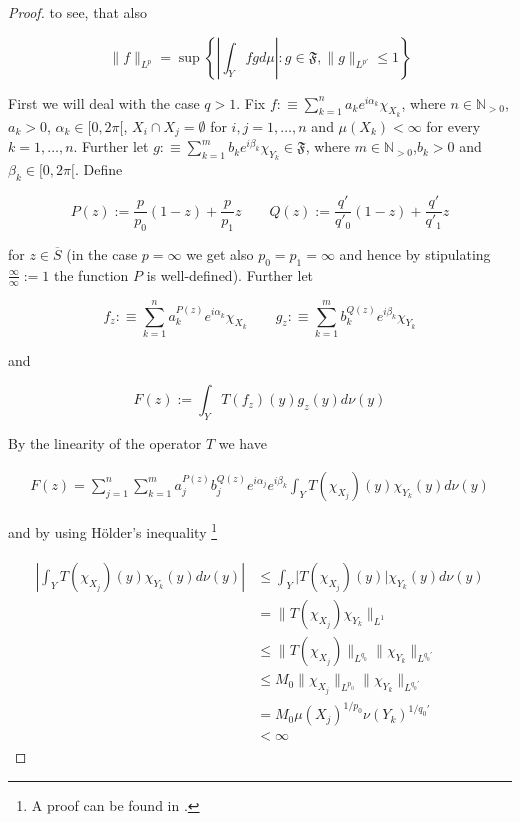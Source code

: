 \begin{proof}
	to see, that also

	\begin{equation*}
		\|f\|_{L^p} = \sup \left\{ \left\vert \int_Y fgd\mu\right\vert : g \in \mathfrak{F},\|g\|_{L^{p'}} \leqslant 1\right\}
	\end{equation*}

	First we will deal with the case \underline{$q > 1$}. Fix $f :\equiv \sum_{k = 1}^n a_k e^{i\alpha_k}\chi_{X_k}$, where $n \in \mathbb{N}_{>0}$,$a_k > 0$, $\alpha_k \in [0,2\pi[$, $X_i \cap X_j = \emptyset$ for $i,j = 1,\hdots,n$ and $\mu(X_k) < \infty$ for every $k = 1,\hdots,n$. Further let $g :\equiv \sum_{k = 1}^m b_k e^{i\beta_k}\chi_{Y_k} \in \mathfrak{F}$, where $m \in \mathbb{N}_{>0}$,$b_k > 0$ and $\beta_k \in [0,2\pi[$. Define

				\begin{equation*}
					P(z) := \frac{p}{p_0}(1 - z) + \frac{p}{p_1}z \qquad Q(z) := \frac{q'}{q'_0}(1 - z) + \frac{q'}{q'_1}z
				\end{equation*}

				for $z \in \overline{S}$ (in the case $p = \infty$ we get also $p_0 = p_1 = \infty$ and hence by stipulating $\frac{\infty}{\infty}:= 1$ the function $P$ is well-defined). Further let
				
				\begin{equation}
					f_z :\equiv \sum_{k = 1}^n a^{P(z)}_k e^{i\alpha_k}\chi_{X_k} \qquad g_z :\equiv  \sum_{k = 1}^m b^{Q(z)}_k e^{i\beta_k}\chi_{Y_k}
					\label{def:fzgz}
				\end{equation}
				
				and 

				\begin{equation}
					F(z) := \int_Y T(f_z)(y)g_z(y)d\nu(y)
				\end{equation}

				By the linearity of the operator $T$ we have

				\begin{gather}
					F(z) = \sum_{j = 1}^n\sum_{k = 1}^m a^{P(z)}_j b_j^{Q(z)} e^{i\alpha_j} e^{i\beta_k} \int_YT(\chi_{X_j})(y)\chi_{Y_k}(y)d\nu(y) 
				\end{gather}

				and by using H\"older's inequality \footnote{A proof can be found in \cite[223]{elstrodt:mass:2011}.}

				\begin{gather}
					\begin{aligned}
						\left\vert \int_YT(\chi_{X_j})(y)\chi_{Y_k}(y)d\nu(y) \right\vert &\leqslant \int_Y\vert T(\chi_{X_j})(y)\vert \chi_{Y_k}(y)d\nu(y)\\
						&= \|T(\chi_{X_j})\chi_{Y_k}\|_{L^1}\\
						&\leqslant \|T(\chi_{X_j})\|_{L^{q_0}} \|\chi_{Y_k}\|_{L^{q_0'}}\\
						&\leqslant M_0\|\chi_{X_j}\|_{L^{p_0}} \|\chi_{Y_k}\|_{L^{q_0'}}\\
						&= M_0 \mu(X_j)^{1/p_0} \nu(Y_k)^{1/q_0'}\\
						&< \infty
					\end{aligned}
				\end{gather}


\end{proof}
